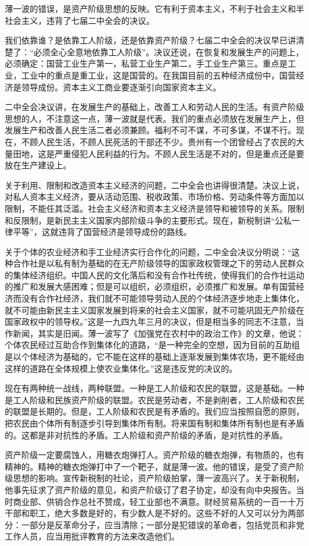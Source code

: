 薄一波的错误，是资产阶级思想的反映。它有利于资本主义，不利于社会主义和半社会主义，违背了七届二中全会的决议。

我们依靠谁？是依靠工人阶级，还是依靠资产阶级？七届二中全会的决议早已讲清楚了：“必须全心全意地依靠工人阶级”。决议还说，在恢复和发展生产的问题上，必须确定：国营工业生产第一，私营工业生产第二，手工业生产第三。重点是工业，工业中的重点是重工业，这是国营的。在我国目前的五种经济成份中，国营经济是领导成份。资本主义工商业要逐渐引向国家资本主义。

二中全会决议讲，在发展生产的基础上，改善工人和劳动人民的生活。有资产阶级思想的人，不注意这一点，薄一波就是代表。我们的重点必须放在发展生产上，但发展生产和改善人民生活二者必须兼顾。福利不可不谋，不可多谋，不谋不行。现在，不顾人民生活，不顾人民死活的干部还不少。贵州有一个团曾经占了农民的大量田地，这是严重侵犯人民利益的行为。不顾人民生活是不对的，但是重点还是要放在生产建设上。

关于利用、限制和改造资本主义经济的问题，二中全会也讲得很清楚。决议上说，对私人资本主义经济，要从活动范围、税收政策、市场价格、劳动条件等方面加以限制，不能任其泛滥。社会主义经济和资本主义经济是领导和被领导的关系。限制和反限制，是新民主主义国家内部阶级斗争的主要形式。现在，新税制讲“公私一律平等”，这就违背了国营经济是领导成份的路线。

关于个体的农业经济和手工业经济实行合作化的问题，二中全会决议分明说：“这种合作社是以私有制为基础的在无产阶级领导的国家政权管理之下的劳动人民群众的集体经济组织。中国人民的文化落后和没有合作社传统，使得我们的合作社运动的推广和发展大感困难；但是可以组织，必须组织，必须推广和发展。单有国营经济而没有合作社经济，我们就不可能领导劳动人民的个体经济逐步地走上集体化，就不可能由新民主主义国家发展到将来的社会主义国家，就不可能巩固无产阶级在国家政权中的领导权。”这是一九四九年三月的决议，但是相当多的同志不注意，当作新闻，其实是旧闻。薄一波写了《加强党在农村中的政治工作》的文章，他说：个体农民经过互助合作到集体化的道路，“是一种完全的空想，因为目前的互助组是以个体经济为基础的，它不能在这样的基础上逐渐发展到集体农场，更不能经由这样的道路在全体规模上使农业集体化。”这是违反党的决议的。

现在有两种统一战线，两种联盟。一种是工人阶级和农民的联盟，这是基础。一种是工人阶级和民族资产阶级的联盟。农民是劳动者，不是剥削者，工人阶级和农民的联盟是长期的。但是，工人阶级和农民是有矛盾的。我们应当按照自愿的原则，把农民由个体所有制逐步引导到集体所有制。将来国有制和集体所有制也是有矛盾的。这都是非对抗性的矛盾。工人阶级和资产阶级的矛盾，是对抗性的矛盾。

资产阶级一定要腐蚀人，用糖衣炮弹打人。资产阶级的糖衣炮弹，有物质的，也有精神的。精神的糖衣炮弹打中了一个靶子，就是薄一波。他的错误，是受了资产阶级思想的影响。宣传新税制的社论，资产阶级拍掌，薄一波高兴了。关于新税制，他事先征求了资产阶级的意见，和资产阶级订了君子协定，却没有向中央报告。当时商业部、供销合作总社不赞成，轻工业部也不满意。财经贸易系统的一百一十万干部和职工，绝大多数是好的，有少数人是不好的。这些不好的人又可以分为两部分：一部分是反革命分子，应当清除；一部分是犯错误的革命者，包括党员和非党工作人员，应当用批评教育的方法来改造他们。

